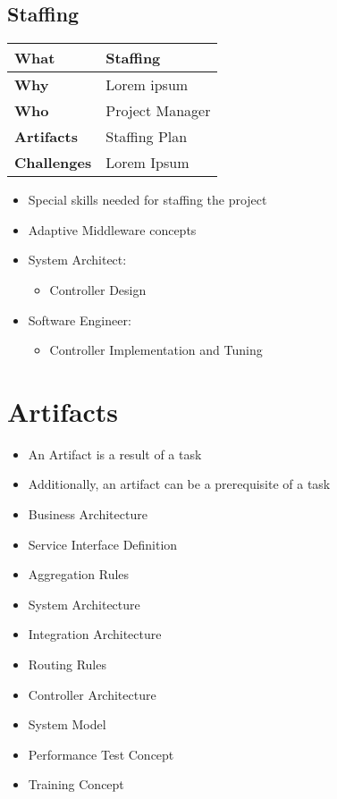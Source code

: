 \subsection{Staffing}
\begin{minipage}{\textwidth}
 \label{table:ch6_Task_Staffing}
\begin{tabular}
	{|m{3cm}|m{10cm}|} \hline \bfseries What & Staffing\\
	\hline \bfseries Why & Lorem ipsum\\
	\hline \bfseries Who & Project Manager\\
	\hline \bfseries Artifacts & Staffing Plan\\
	\hline \bfseries Challenges & Lorem Ipsum\\
	\hline 
\end{tabular}
\end{minipage}

\begin{itemize}
	\item Special skills needed for staffing the project
	\item Adaptive Middleware concepts
	\item System Architect:
	\begin{itemize}
		\item Controller Design
	\end{itemize}
	\item Software Engineer:
	\begin{itemize}
		\item Controller Implementation and Tuning
	\end{itemize}
\end{itemize}

\section{Artifacts}

\begin{itemize}
	\item An Artifact is a result of a task
	\item Additionally, an artifact can be a prerequisite of a task
\end{itemize}

\begin{itemize}
	\item Business Architecture
	\item Service Interface Definition
	\item Aggregation Rules
	\item System Architecture
	\item Integration Architecture
	\item Routing Rules
	\item Controller Architecture
	\item System Model
	\item Performance Test Concept
	\item Training Concept
\end{itemize}


